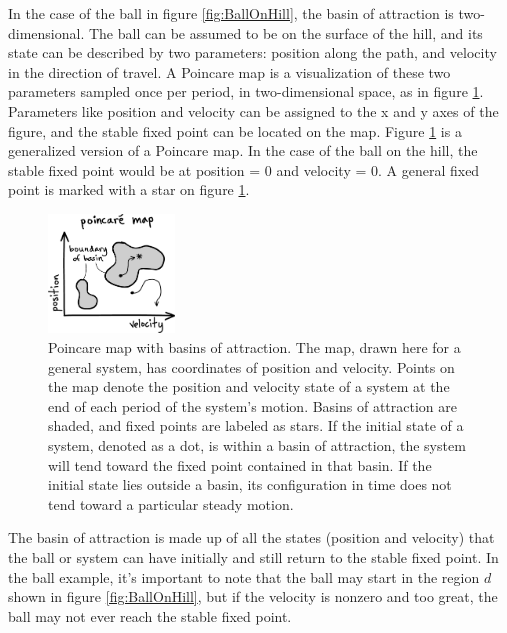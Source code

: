In the case of the ball in figure \ref{fig:BallOnHill}, the basin of attraction is two-dimensional. The ball can be assumed to be on the surface of the hill, and its state can be described by two parameters: position along the path, and velocity in the direction of travel. A Poincare map is a visualization of these two parameters sampled once per period, in two-dimensional space, as in figure \ref{fig:BasinOfAttraction}. Parameters like position and velocity can be assigned to the x and y axes of the figure, and the stable fixed point can be located on the map. Figure \ref{fig:BasinOfAttraction} is a generalized version of a Poincare map. In the case of the ball on the hill, the stable fixed point would be at position = 0 and velocity = 0. A general fixed point is marked with a star on figure \ref{fig:BasinOfAttraction}. 

\begin{figure}[h]		%
\begin{centering}
\includegraphics[width=0.3\textwidth]{Figures/BasinOfAttraction}\par
\end{centering}
\caption[Diagram: Poincare Map with Basins of Attraction]{Poincare map with basins of attraction. The map, drawn here for a general system, has coordinates of position and velocity. Points on the map denote the position and velocity state of a system at the end of each period of the system's motion. Basins of attraction are shaded, and fixed points are labeled as stars. If the initial state of a system, denoted as a dot, is within a basin of attraction, the system will tend toward the fixed point contained in that basin. If the initial state lies outside a basin, its configuration in time does not tend toward a particular steady motion.}
\label{fig:BasinOfAttraction}
\end{figure}
%

The basin of attraction is made up of all the states (position and velocity) that the ball or system can have initially and still return to the stable fixed point. In the ball example, it's important to note that the ball may start in the region $d$ shown in figure \ref{fig:BallOnHill}, but if the velocity is nonzero and too great, the ball may not ever reach the stable fixed point. 

